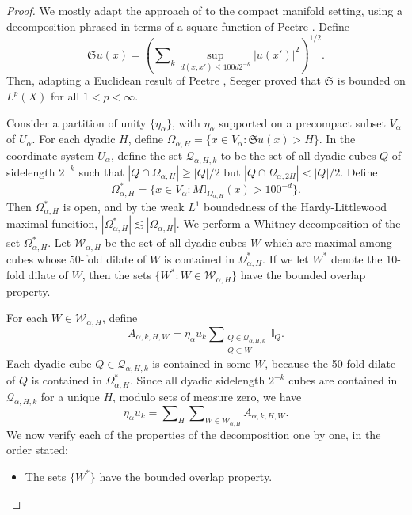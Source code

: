 \begin{proof}
    We mostly adapt the approach of \cite{HeoandNazarovandSeeger2} to the compact manifold setting, using a decomposition phrased in terms of a square function of Peetre \cite{Peetre}. Define
    \begin{equation}
        \mathfrak{S}u(x) = \left( \sum\nolimits_k \sup_{d(x,x') \leq 100 d 2^{-k} } |u(x')|^2 \right)^{1/2}.
    \end{equation}
    Then, adapting a Euclidean result of Peetre \cite{Peetre}, Seeger \cite{SeegerEndpointEstimatesMultipliers} proved that $\mathfrak{S}$ is bounded on $L^p(X)$ for all $1 < p < \infty$.

    Consider a partition of unity $\{ \eta_\alpha \}$, with $\eta_\alpha$ supported on a precompact subset $V_\alpha$ of $U_\alpha$. For each dyadic $H$, define $\Omega_{\alpha,H} = \{ x \in V_\alpha : \mathfrak{S} u(x) > H \}$. In the coordinate system $U_\alpha$, define the set $\mathcal{Q}_{\alpha, H,k}$ to be the set of all dyadic cubes $Q$ of sidelength $2^{-k}$ such that $|Q \cap \Omega_{\alpha,H}| \geq |Q| / 2$ but $|Q \cap \Omega_{\alpha,2H}| < |Q|/2$. Define
    \begin{equation}
        \Omega_{\alpha,H}^* = \{ x \in V_\alpha : M \mathbb{I}_{\Omega_{\alpha,H}}(x) > 100^{-d} \}.
    \end{equation}
    Then $\Omega_{\alpha,H}^*$ is open, and by the weak $L^1$ boundedness of the Hardy-Littlewood maximal funcition, $|\Omega_{\alpha,H}^*| \lesssim |\Omega_{\alpha,H}|$. We perform a Whitney decomposition of the  set $\Omega_{\alpha,H}^*$. Let $\mathcal{W}_{\alpha,H}$ be the set of all dyadic cubes $W$ which are maximal among cubes whose $50$-fold dilate of $W$ is contained in $\Omega_{\alpha,H}^*$. If we let $W^*$ denote the 10-fold dilate of $W$, then the sets $\{ W^* : W \in \mathcal{W}_{\alpha,H} \}$ have the bounded overlap property.
    
    For each $W \in \mathcal{W}_{\alpha,H}$, define
    \begin{equation}
        A_{\alpha,k,H,W} = \eta_\alpha u_k \sum\nolimits_{\substack{Q \in \mathcal{Q}_{\alpha,H,k}\\Q \subset W}} \mathbb{I}_Q.
    \end{equation}
    Each dyadic cube $Q \in \mathcal{Q}_{\alpha,H,k}$ is contained in some $W$, because the 50-fold dilate of $Q$ is contained in $\Omega_{\alpha,H}^*$. Since all dyadic sidelength $2^{-k}$ cubes are contained in $\mathcal{Q}_{\alpha,H,k}$ for a unique $H$, modulo sets of measure zero, we have
    \begin{equation}
        \eta_\alpha u_k = \sum \nolimits_H \sum\nolimits_{W \in \mathcal{W}_{\alpha,H}} A_{\alpha,k,H,W}.
    \end{equation}
    We now verify each of the properties of the decomposition one by one, in the order stated:
    \begin{itemize}
        \item The sets $\{ W^* \}$ have the bounded overlap property.


\end{itemize}
\end{proof}
